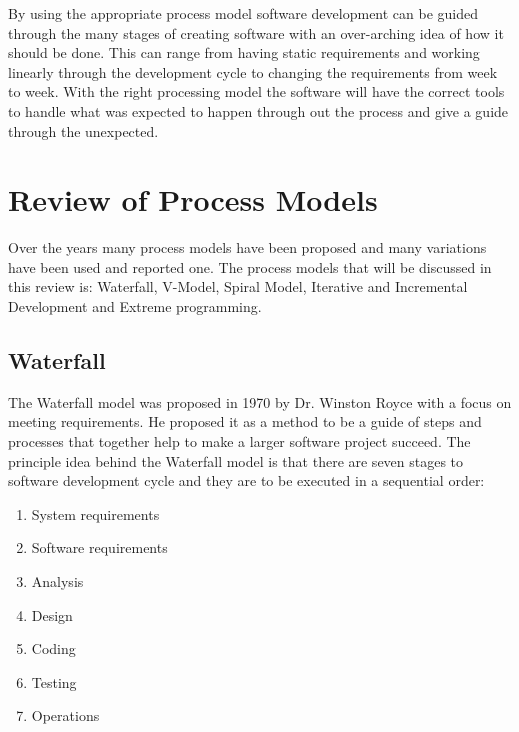 \documentclass{style/CRPITStyle}
\renewcommand{\cite}{\citep}
\begin{document}
By using the appropriate process model software development can be guided
through the many stages of creating software with an over-arching idea of how it
should be done. This can range from having static requirements and working
linearly through the development cycle to changing the requirements from week to
week. With the right processing model the software will have the correct tools
to handle what was expected to happen through out the process and give a guide
through the unexpected.


\section{Review of Process Models}

Over the years many process models have been proposed and many variations have
been used and reported one. The process models that will be discussed in this
review is: Waterfall, V-Model, Spiral Model, Iterative and Incremental Development and
Extreme programming.

\subsection{Waterfall} %

The Waterfall model was proposed in 1970 by Dr. Winston Royce \cite{royce:1970:waterfall} 
with a focus on meeting requirements.
He proposed it as a method to be a guide of steps and processes that together
help to make a larger software project succeed. 
The principle idea behind the Waterfall model is that there are seven stages to
software development cycle and they are to be executed in a sequential order:

\begin{enumerate}
  \item System requirements
  \item Software requirements
  \item Analysis
  \item Design
  \item Coding
  \item Testing 
  \item Operations
\end{enumerate}
\end{document}
